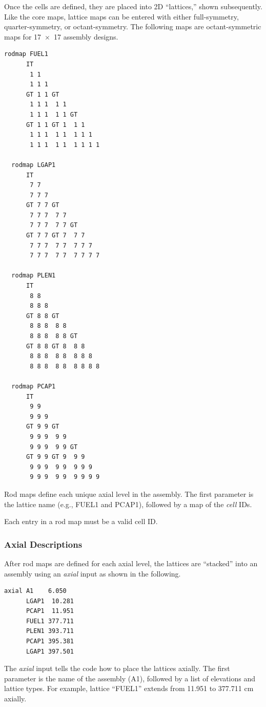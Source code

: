 Once the cells are defined, they are placed into 2D ``lattices,'' shown subsequently.
Like the core maps, lattice maps can be entered with either full-symmetry, quarter-symmetry,
or octant-symmetry. The following maps are octant-symmetric maps for 17~$\times$~17 assembly designs.
\vfill   %
\begin{Verbatim}[fontsize=\small]
  rodmap FUEL1
      IT
       1 1
       1 1 1
      GT 1 1 GT
       1 1 1  1 1
       1 1 1  1 1 GT
      GT 1 1 GT 1  1 1
       1 1 1  1 1  1 1 1
       1 1 1  1 1  1 1 1 1

  rodmap LGAP1
      IT
       7 7
       7 7 7
      GT 7 7 GT
       7 7 7  7 7
       7 7 7  7 7 GT
      GT 7 7 GT 7  7 7
       7 7 7  7 7  7 7 7
       7 7 7  7 7  7 7 7 7

  rodmap PLEN1
      IT
       8 8
       8 8 8
      GT 8 8 GT
       8 8 8  8 8
       8 8 8  8 8 GT
      GT 8 8 GT 8  8 8
       8 8 8  8 8  8 8 8
       8 8 8  8 8  8 8 8 8

  rodmap PCAP1
      IT
       9 9
       9 9 9
      GT 9 9 GT
       9 9 9  9 9
       9 9 9  9 9 GT
      GT 9 9 GT 9  9 9
       9 9 9  9 9  9 9 9
       9 9 9  9 9  9 9 9 9

\end{Verbatim}

Rod maps define each unique axial level in the assembly.
The first parameter is the lattice name (e.g., FUEL1 and PCAP1),
followed by a map of the {\it cell} IDs.

Each entry in a rod map must be a valid cell ID.

\subsubsection{Axial Descriptions}

After rod maps are defined for each axial level, the lattices are ``stacked'' into
an assembly using an {\it axial} input as shown in the following.

\begin{Verbatim}[fontsize=\small]
  axial A1    6.050
      LGAP1  10.281
      PCAP1  11.951
      FUEL1 377.711
      PLEN1 393.711
      PCAP1 395.381
      LGAP1 397.501

\end{Verbatim}

The {\it axial} input tells the code how to place the lattices axially.
The first parameter is the name of the assembly (A1), followed by a
list of elevations and lattice types.
For example, lattice ``FUEL1'' extends from 11.951 to 377.711 cm axially.

